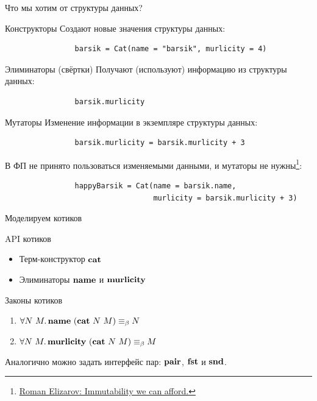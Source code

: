     \begin{frame}[fragile]{Что мы хотим от структуры данных?}
        \pause
        \vspace{-0.5em}
        \begin{block}{Конструкторы}
            Создают новые значения структуры данных:
            \begin{verbatim}
                barsik = Cat(name = "barsik", murlicity = 4)
            \end{verbatim}
        \end{block}
        \pause
        \begin{block}{Элиминаторы (свёртки)}
            Получают (используют) информацию из структуры данных:
            \begin{verbatim}
                barsik.murlicity
            \end{verbatim}
        \end{block}
        \pause
        \begin{block}{Мутаторы}
            Изменение информации в экземпляре структуры данных:
            \begin{verbatim}
                barsik.murlicity = barsik.murlicity + 3
            \end{verbatim}
            \pause
            В ФП не принято пользоваться изменяемыми данными, и мутаторы не нужны\footnote{\href{https://elizarov.medium.com/immutability-we-can-afford-10c0dcb8351d}{\color{blue} Roman Elizarov: Immutability we can afford.}}:
            \begin{verbatim}
                happyBarsik = Cat(name = barsik.name,
                                  murlicity = barsik.murlicity + 3)
            \end{verbatim}
        \end{block}
    \end{frame}

    \begin{frame}[fragile]{Моделируем котиков}
        \pause
        \begin{block}{API котиков}
            \begin{itemize}
                \item Терм-конструктор $\mathbf{cat}$
                \item Элиминаторы $\mathbf{name}$ и $\mathbf{murlicity}$
            \end{itemize}
        \end{block}
        \pause
        \begin{block}{Законы котиков}
            \begin{enumerate}
                \item $\forall N~M\ldotp \mathbf{name}~(\mathbf{cat}~N~M) \equiv_\beta N$
                \item $\forall N~M\ldotp \mathbf{murlicity}~(\mathbf{cat}~N~M) \equiv_\beta M$
            \end{enumerate}
        \end{block}
        Аналогично можно задать интерфейс пар: $\mathbf{pair}$, $\mathbf{fst}$ и $\mathbf{snd}$.
    \end{frame}

